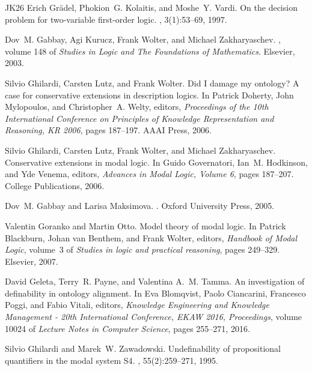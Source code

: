 \documentclass[10pt,a4paper]{amsart}
\theoremstyle{plain}
\theoremstyle{definition}
\begin{document}
\begin{thebibliography}{{}JK{\etalchar{+}}26}
Erich Gr{\"{a}}del, Phokion~G. Kolaitis, and Moshe~Y. Vardi.
\newblock On the decision problem for two-variable first-order logic.
, 3(1):53--69, 1997.

Dov~M. Gabbay, Agi Kurucz, Frank Wolter, and Michael Zakharyaschev.
, volume 148 of {\em Studies in Logic and The Foundations of Mathematics}.
\newblock Elsevier, 2003.

Silvio Ghilardi, Carsten Lutz, and Frank Wolter.
\newblock Did {I} damage my ontology? {A} case for conservative extensions in description logics.
\newblock In Patrick Doherty, John Mylopoulos, and Christopher~A. Welty, editors, {\em Proceedings of the 10th International Conference on Principles of Knowledge Representation and Reasoning, KR 2006}, pages 187--197. {AAAI} Press, 2006.

Silvio Ghilardi, Carsten Lutz, Frank Wolter, and Michael Zakharyaschev.
\newblock Conservative extensions in modal logic.
\newblock In Guido Governatori, Ian~M. Hodkinson, and Yde Venema, editors, {\em Advances in Modal Logic, Volume 6}, pages 187--207. College Publications, 2006.

Dov~M. Gabbay and Larisa Maksimova.
.
\newblock Oxford University Press, 2005.

Valentin Goranko and Martin Otto.
\newblock Model theory of modal logic.
\newblock In Patrick Blackburn, Johan van Benthem, and Frank Wolter, editors, {\em Handbook of Modal Logic}, volume~3 of {\em Studies in logic and practical reasoning}, pages 249--329. Elsevier, 2007.

David Geleta, Terry~R. Payne, and Valentina A.~M. Tamma.
\newblock An investigation of definability in ontology alignment.
\newblock In Eva Blomqvist, Paolo Ciancarini, Francesco Poggi, and Fabio Vitali, editors, {\em Knowledge Engineering and Knowledge Management - 20th International Conference, {EKAW} 2016, Proceedings}, volume 10024 of {\em Lecture Notes in Computer Science}, pages 255--271, 2016.

Silvio Ghilardi and Marek~W. Zawadowski.
\newblock Undefinability of propositional quantifiers in the modal system {S4}.
, 55(2):259--271, 1995.


\end{thebibliography}
\end{document}

